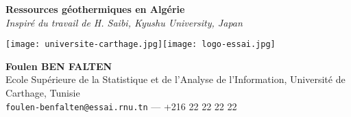 \documentclass[a0, portrait]{a0poster}
\begin{document}


\begin{minipage}[b]{0.75\linewidth}
\VeryHuge \color{NavyBlue} \textbf{Ressources géothermiques en Algérie} \color{Black}\\[0.5cm]%
\Huge\textit{Inspiré du travail de H. Saibi, Kyushu University, Japan}\\[0.5cm]%
\end{minipage}
%
\begin{minipage}[b]{0.25\linewidth}
\texttt{[image: universite-carthage.jpg]}\texttt{[image: logo-essai.jpg]}
\end{minipage}

\begin{minipage}[b]{0.75\linewidth}
\huge \textbf{Foulen BEN FALTEN}\\[0.5cm] %
\Large Ecole Sup\'erieure de la Statistique et de l'Analyse de l'Information, Université de Carthage, Tunisie\\[0.4cm] %
\large \texttt{foulen-benfalten@essai.rnu.tn} --- +216 22 22 22 22\\
\end{minipage}


\vspace{1cm} %

\end{document}
